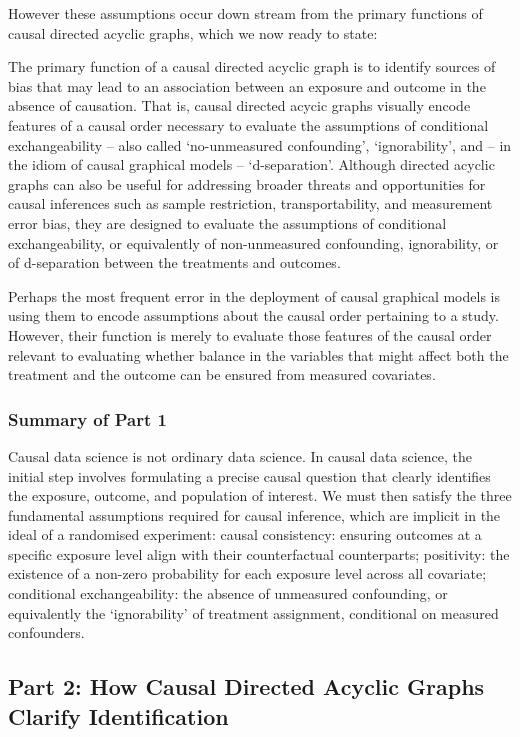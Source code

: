 \documentclass[
  single column]{article}
\begin{document}
However these assumptions occur down stream from the primary functions
of causal directed acyclic graphs, which we now ready to state:

The primary function of a causal directed acyclic graph is to identify
sources of bias that may lead to an association between an exposure and
outcome in the absence of causation. That is, causal directed acycic
graphs visually encode features of a causal order necessary to evaluate
the assumptions of conditional exchangeability -- also called
`no-unmeasured confounding', `ignorability', and -- in the idiom of
causal graphical models -- `d-separation'. Although directed acyclic
graphs can also be useful for addressing broader threats and
opportunities for causal inferences such as sample restriction,
transportability, and measurement error bias, they are designed to
evaluate the assumptions of conditional exchangeability, or equivalently
of non-unmeasured confounding, ignorability, or of d-separation between
the treatments and outcomes.

Perhaps the most frequent error in the deployment of causal graphical
models is using them to encode assumptions about the causal order
pertaining to a study. However, their function is merely to evaluate
those features of the causal order relevant to evaluating whether
balance in the variables that might affect both the treatment and the
outcome can be ensured from measured covariates.

\subsubsection{Summary of Part 1}\label{summary-of-part-1}

Causal data science is not ordinary data science. In causal data
science, the initial step involves formulating a precise causal question
that clearly identifies the exposure, outcome, and population of
interest. We must then satisfy the three fundamental assumptions
required for causal inference, which are implicit in the ideal of a
randomised experiment: causal consistency: ensuring outcomes at a
specific exposure level align with their counterfactual counterparts;
positivity: the existence of a non-zero probability for each exposure
level across all covariate; conditional exchangeability: the absence of
unmeasured confounding, or equivalently the `ignorability' of treatment
assignment, conditional on measured confounders.

\newpage{}

\subsection{Part 2: How Causal Directed Acyclic Graphs Clarify
Identification}\label{part-2-how-causal-directed-acyclic-graphs-clarify-identification}
\end{document}
